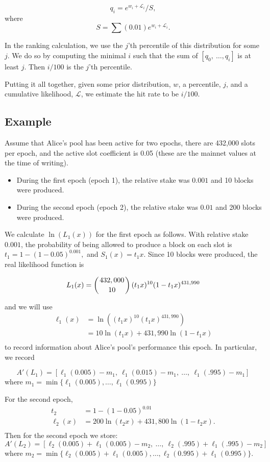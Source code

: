 \documentclass[11pt,a4paper,dvipsnames,twosided]{article}
\begin{document}
\[ q_i = e^{w_i + \mathcal{L}_i} / S, \]
where
\[ S = \sum (0.01) e^{w_i + \mathcal{L}_i}. \]

In the ranking calculation, we use the $j$'th percentile of this distribution for some $j$.
We do so by computing the minimal $i$ such that the sum of $[q_0,~\ldots,q_i]$ is at least $j$.
Then $i/100$ is the $j$'th percentile.

Putting it all together, given some prior distribution, $w$, a percentile, $j$, and a cumulative likelihood, $\mathcal{L}$,
we estimate the hit rate to be $i/100$.


\subsection{Example}

Assume that Alice's pool has been active for two epochs,
there are 432,000 slots per epoch, and the active slot coefficient is 0.05
(these are the mainnet values at the time of writing).
\begin{itemize}
\item
  During the first epoch (epoch 1), the relative stake was $0.001$ and 10 blocks were produced.
\item
  During the second epoch (epoch 2), the relative stake was $0.01$ and 200 blocks were produced.
\end{itemize}
We calculate $\ln(L_1(x))$ for the first epoch as follows.
%
With relative stake $0.001$, the probability of being allowed to produce a block on
each slot is $t_1 = 1-(1-0.05)^{0.001},$ and $S_1(x)= t_1x$.
Since 10 blocks were produced, the real likelihood function is

\[ L_1(x) =  \left( 432,000 \atop 10 \right) (t_1x)^{10} (1-t_1x)^{431,990} \]

and we will use
\[
\begin{array}{rl}
  \ell_1(x) &= \ln\left( (t_1x)^{10} (t_1x)^{431,990} \right) \\
            &= 10 \ln(t_1 x) + 431,990 \ln(1 - t_1 x) \\
\end{array}
\]
to record information about Alice's pool's performance this epoch.
In particular, we record

\[ A'(L_1) = [\ell_1(0.005)-m_1,~\ell_1(0.015)-m_1,~\ldots,~\ell_1(.995)-m_1] \]
where $m_1=\min\{\ell_1(0.005),\ldots,\ell_1(0.995)\}$

For the second epoch,
\[
\begin{array}{rl}
  t_2 &= 1-(1-0.05)^{0.01} \\
  \ell_2(x) &= 200 \ln(t_2 x) + 431,800 \ln(1 - t_2 x).\\
\end{array}
\]
Then for the second epoch we store:
\[ A'(L_2) = [\ell_2(0.005)+\ell_1(0.005)-m_2,~\ldots,~\ell_2(.995)+\ell_1(.995)-m_2] \]
where $m_2=\min\{\ell_2(0.005)+\ell_1(0.005),\ldots,\ell_2(0.995)+\ell_1(0.995)\}$.
\end{document}

